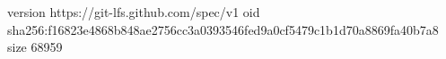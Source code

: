 version https://git-lfs.github.com/spec/v1
oid sha256:f16823e4868b848ae2756cc3a0393546fed9a0cf5479c1b1d70a8869fa40b7a8
size 68959
